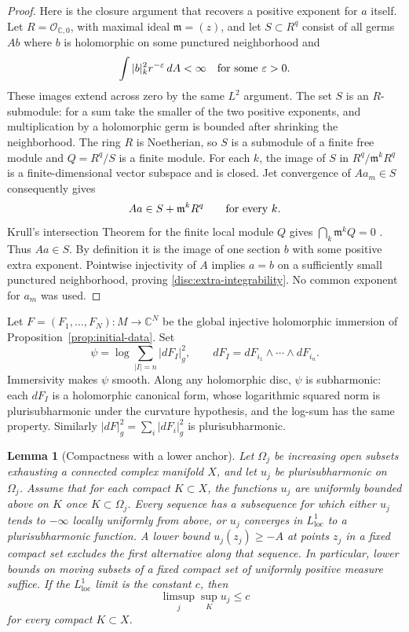 \documentclass[11pt]{article}
\newtheorem{lemma}[theorem]{Lemma}
\theoremstyle{definition}
\theoremstyle{remark}
\newcommand{\C}{\mathbb C}
\numberwithin{equation}{section}
\begin{document}
\begin{proof}
Here is the closure argument that recovers a positive exponent for
$a$ itself.  Let $R=\mathcal O_{\C,0}$, with maximal ideal
$\mathfrak m=(z)$, and let $S\subset R^q$ consist of all germs $Ab$
where $b$ is holomorphic on some punctured neighborhood and
\[
 \int |b|_k^2r^{-\varepsilon}\,dA<\infty
 \quad\hbox{for some }\varepsilon>0.
\]
These images extend across zero by the same $L^2$ argument.  The set
$S$ is an $R$-submodule: for a sum take the smaller of the two positive
exponents, and multiplication by a holomorphic germ is bounded after
shrinking the neighborhood.  The ring $R$ is Noetherian, so $S$ is a
submodule of a finite free module and $Q=R^q/S$ is a finite module.
For each $k$, the image of $S$ in $R^q/\mathfrak m^kR^q$ is a
finite-dimensional vector subspace and is closed.  Jet convergence of
$Aa_m\in S$ consequently gives
\[
 Aa\in S+\mathfrak m^kR^q\qquad\hbox{for every }k.
\]
Krull's intersection Theorem for the finite local module $Q$ gives
$\bigcap_k\mathfrak m^kQ=0$ \cite[Lemma 10.51.4]{StacksKrull}.
Thus $Aa\in S$.  By definition it is the image of one section $b$
with some positive extra exponent.  Pointwise injectivity of $A$
implies $a=b$ on a sufficiently small punctured neighborhood, proving
\eqref{disc:extra-integrability}.  No common exponent for $a_m$ was
used.
\end{proof}

Let $F=(F_1,\ldots,F_N):M\to\C^N$ be the global injective
holomorphic immersion of Proposition~\ref{prop:initial-data}.  Set
\[
 \psi=\log\sum_{|I|=n}|dF_I|_g^2,
 \qquad dF_I=dF_{i_1}\wedge\cdots\wedge dF_{i_n}.
\]
Immersivity makes $\psi$ smooth.  Along any holomorphic disc,
$\psi$ is subharmonic: each $dF_I$ is a holomorphic canonical form,
whose logarithmic squared norm is plurisubharmonic under the curvature
hypothesis, and the log-sum has the same property.  Similarly
$|dF|_g^2=\sum_i|dF_i|_g^2$ is plurisubharmonic.

\begin{lemma}[Compactness with a lower anchor]\label{lem:psh-compactness-bridge}
Let $\Omega_j$ be increasing open subsets exhausting a connected
complex manifold $X$, and let $u_j$ be plurisubharmonic on $\Omega_j$.
Assume that for each compact $K\subset X$, the functions $u_j$ are
uniformly bounded above on $K$ once $K\subset\Omega_j$.
Every sequence has a subsequence for which either $u_j$ tends to
$-\infty$ locally uniformly from above, or $u_j$ converges in
$L^1_{\mathrm{loc}}$ to a plurisubharmonic function.
A lower bound $u_j(z_j)\ge-A$ at points $z_j$ in a fixed compact set
excludes the first alternative along that sequence.  In particular,
lower bounds on moving subsets of a fixed compact set of uniformly
positive measure suffice.  If the $L^1_{\mathrm{loc}}$ limit is the
constant $c$, then
\[
 \limsup_j\sup_K u_j\le c
\]
for every compact $K\subset X$.
\end{lemma}
\end{document}
